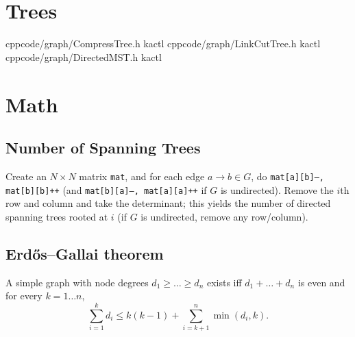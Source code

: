 \section{Trees}
    {}{}
    {cpp}{code/graph/CompressTree.h}
    {kactl}
    {}{}
    {cpp}{code/graph/LinkCutTree.h}
    {kactl}
    {}{}
    {cpp}{code/graph/DirectedMST.h}
    {kactl}

\section{Math}
	\subsection{Number of Spanning Trees}
		Create an $N\times N$ matrix \texttt{mat}, and for each edge $a \rightarrow b \in G$, do
		\texttt{mat[a][b]--, mat[b][b]++} (and \texttt{mat[b][a]--, mat[a][a]++} if $G$ is undirected).
		Remove the $i$th row and column and take the determinant; this yields the number of directed spanning trees rooted at $i$
		(if $G$ is undirected, remove any row/column).

	\subsection{Erdős–Gallai theorem}
		A simple graph with node degrees $d_1 \ge \dots \ge d_n$ exists iff $d_1 + \dots + d_n$ is even and for every $k = 1\dots n$,
		\[ \sum _{i=1}^{k}d_{i}\leq k(k-1)+\sum _{i=k+1}^{n}\min(d_{i},k). \]
